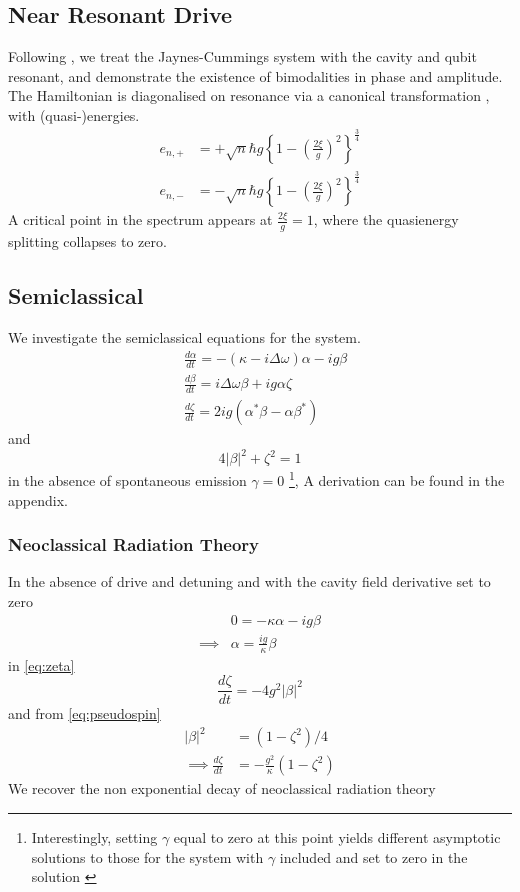 \subsection{Near Resonant Drive}
Following \cite{Carmichael2015}, we treat the Jaynes-Cummings system with the cavity and qubit resonant, and demonstrate the existence of bimodalities in phase and amplitude.
The Hamiltonian is diagonalised on resonance via a canonical transformation \cite{Alsing1992}, with (quasi-)energies.
\begin{align}
  e_{n, +} &= + \sqrt{n} \hbar g {\left \{1 - {\left ({\frac{2\xi}{g}} \right )}^2 \right \}}^{\frac{3}{4}} \\
  e_{n, -} &= - \sqrt{n} \hbar g {\left \{1 - {\left ({\frac{2\xi}{g}} \right )}^2 \right \}}^{\frac{3}{4}}
\end{align}
A critical point in the spectrum appears at $\frac{2\xi}{g} = 1$, where the quasienergy splitting collapses to zero.
\subsection{Semiclassical}
We investigate the semiclassical equations for the system.
\begin{align}
  &\frac{d \alpha}{dt} = -(\kappa -i \Delta \omega) \alpha-ig \beta \label{eq:alpha}\\
  &\frac{d \beta}{dt} = i \Delta \omega \beta +ig \alpha \zeta \label{eq:beta}\\
  &\frac{d \zeta}{dt} = 2 i g(\alpha^* \beta -\alpha \beta^*)\label{eq:zeta}
\end{align}
and
\begin{equation}
  4|\beta|^2+\zeta^2 = 1 \label{eq:pseudospin}
\end{equation}
in the absence of spontaneous emission $\gamma=0$
\footnote{ Interestingly, setting $\gamma$ equal to zero at this point yields different asymptotic solutions to those for the system with $\gamma$ included and set to zero in the solution \cite{Alsing1990}},
A derivation can be found in the appendix.
\subsubsection{Neoclassical Radiation Theory}
In the absence of drive and detuning and with the cavity field derivative set to zero
\begin{align}
  & 0 = -\kappa \alpha - ig \beta \\
  \implies & \alpha = \frac{ig}{\kappa} \beta
\end{align}
in \cref{eq:zeta}
\begin{equation}
  \frac{d \zeta}{dt} = -4 g^2 |\beta|^2
\end{equation}
and from \cref{eq:pseudospin}
\begin{align}
   |\beta|^2 &= (1-\zeta^2)/4 \\
\implies \frac{d \zeta}{dt} &= -\frac{g^2}{\kappa} (1-\zeta^2)
\end{align}
We recover the non exponential decay of neoclassical radiation theory
